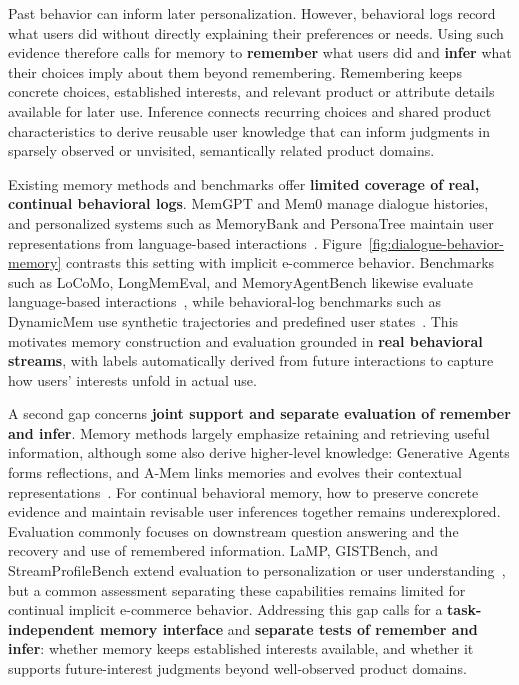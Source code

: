 \documentclass[sigconf,nonacm,balance=false]{acmart}
\begin{document}
Past behavior can inform later personalization. However, behavioral logs record what users did without directly explaining their preferences or needs. Using such evidence therefore calls for memory to \textbf{remember} what users did and \textbf{infer} what their choices imply about them beyond remembering. Remembering keeps concrete choices, established interests, and relevant product or attribute details available for later use. Inference connects recurring choices and shared product characteristics to derive reusable user knowledge that can inform judgments in sparsely observed or unvisited, semantically related product domains. 

Existing memory methods and benchmarks offer \textbf{limited coverage of real, continual behavioral logs}. MemGPT and Mem0 manage dialogue histories, and personalized systems such as MemoryBank and PersonaTree maintain user representations from language-based interactions~\citep{packer2024memgptllmsoperatingsystems,chhikara2025mem0buildingproductionreadyai,zhong2024memorybank,zhao2026insideout}. Figure~\ref{fig:dialogue-behavior-memory} contrasts this setting with implicit e-commerce behavior. Benchmarks such as LoCoMo, LongMemEval, and MemoryAgentBench likewise evaluate language-based interactions~\citep{maharana2024evaluatinglongtermconversationalmemory,wu2025longmemevalbenchmarkingchatassistants,hu2026evaluatingmemoryllmagents}, while behavioral-log benchmarks such as DynamicMem use synthetic trajectories and predefined user states~\citep{xie2026dynamicmemlonghorizonmemorybenchmark}. This motivates memory construction and evaluation grounded in \textbf{real behavioral streams}, with labels automatically derived from future interactions to capture how users' interests unfold in actual use.

A second gap concerns \textbf{joint support and separate evaluation of remember and infer}. Memory methods largely emphasize retaining and retrieving useful information, although some also derive higher-level knowledge: Generative Agents forms reflections, and A-Mem links memories and evolves their contextual representations~\citep{park2023generativeagentsinteractivesimulacra,xu2025amemagenticmemoryllm}. For continual behavioral memory, how to preserve concrete evidence and maintain revisable user inferences together remains underexplored. Evaluation commonly focuses on downstream question answering and the recovery and use of remembered information. LaMP, GISTBench, and StreamProfileBench extend evaluation to personalization or user understanding~\citep{salemi2024lamplargelanguagemodels,fostiropoulos2026gistbenchevaluatingllmuser,wang2026streamprofilebenchbenchmarkfinegraineduser}, but a common assessment separating these capabilities remains limited for continual implicit e-commerce behavior. Addressing this gap calls for a \textbf{task-independent memory interface} and \textbf{separate tests of remember and infer}: whether memory keeps established interests available, and whether it supports future-interest judgments beyond well-observed product domains.
\end{document}
